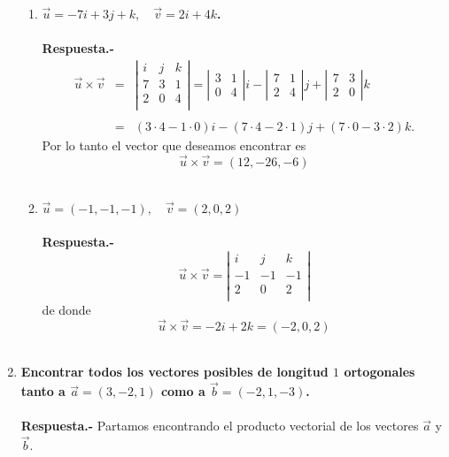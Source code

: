 \begin{enumerate}
\begin{enumerate}[\bfseries a)]
    \item \textbf{\boldmath $\vec{u}=-7i+3j+k, \quad \vec{v}=2i+4k$.\\\\
	Respuesta.-}
	$$\begin{array}{rcl}
	    \vec{u}\times \vec{v} &=& \left|\begin{array}{ccc}
	    i&j&k\\
	    7&3&1\\
	    2&0&4\\
	    \end{array}\right|=\left|\begin{array}{cc}3&1\\ 0&4 \end{array}\right|i - \left|\begin{array}{cc} 7&1\\2&4 \end{array}\right|j + \left|\begin{array}{cc} 7&3\\2&0 \end{array}\right|k\\\\
			      &=&(3\cdot 4 - 1\cdot 0)i - (7\cdot 4-2\cdot 1)j+(7\cdot 0 - 3\cdot 2)k.
    \end{array}$$
	Por lo tanto el vector que deseamos encontrar es $$\vec{u}\times \vec{v}=(12,-26,-6)$$\\

    \item \textbf{\boldmath $\vec{u}=(-1,-1,-1), \quad \vec{v}=(2,0,2)$\\\\
	Respuesta.-}\;
	$$\vec{u}\times \vec{v} = \left|\begin{array}{rrr}
	    i&j&k\\
	    -1&-1&-1\\
	    2&0&2\\
	\end{array}\right|$$
	de donde $$\vec{u}\times \vec{v} = -2i +2k = (-2,0,2)$$\\

\end{enumerate}

\item \textbf{\boldmath Encontrar todos los vectores posibles de longitud $1$ ortogonales tanto a $\vec{a}=(3,-2,1)$ como a $\vec{b}=(-2,1,-3)$.\\\\
    Respuesta.-}\; Partamos encontrando el producto vectorial de los vectores $\vec{a}$ y $\vec{b}.$ 


\end{enumerate}
